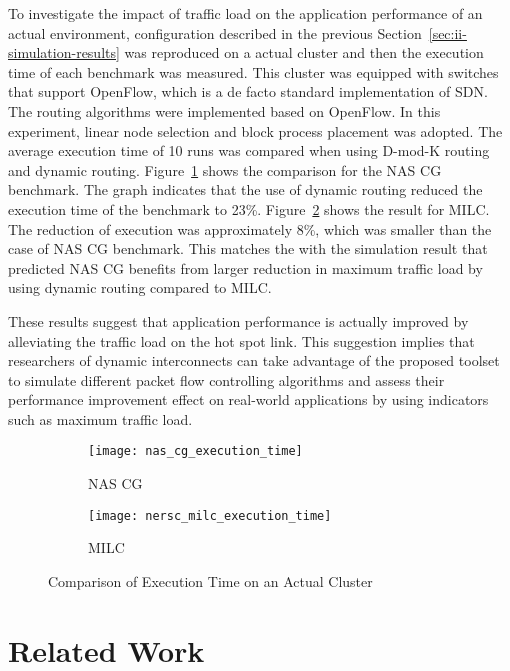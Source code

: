 To investigate the impact of traffic load on the application performance of an
actual environment, configuration described in the previous
Section~\ref{sec:ii-simulation-results} was reproduced on a actual cluster and
then the execution time of each benchmark was measured. This cluster was
equipped with switches that support OpenFlow, which is a de facto standard
implementation of SDN\@. The routing algorithms were implemented based on
OpenFlow. In this experiment, linear node selection and block process
placement was adopted. The average execution time of 10 runs was compared when
using \mbox{D-mod-K} routing and dynamic routing. Figure~\ref{fig:nas-cg-time}
shows the comparison for the NAS CG benchmark. The graph indicates that the
use of dynamic routing reduced the execution time of the benchmark to 23\%.
Figure~\ref{fig:nersc-milc-time} shows the result for MILC\@. The reduction of
execution was approximately 8\%, which was smaller than the case of NAS CG
benchmark. This matches the with the simulation result that predicted NAS CG
benefits from larger reduction in maximum traffic load by using dynamic
routing compared to MILC\@.

These results suggest that application performance is actually improved
by alleviating the traffic load on the hot spot link. This suggestion
implies that researchers of dynamic interconnects can take advantage of
the proposed toolset to simulate different packet flow controlling algorithms
and assess their performance improvement effect on real-world applications by
using indicators such as maximum traffic load.

\begin{figure}
    \begin{subfigure}{.47\linewidth}
        \centering
        \texttt{[image: nas\_cg\_execution\_time]}
        \caption{NAS CG}%
        \label{fig:nas-cg-time}
    \end{subfigure}%
    \begin{subfigure}{.47\linewidth}
        \centering
        \texttt{[image: nersc\_milc\_execution\_time]}
        \caption{MILC}%
        \label{fig:nersc-milc-time}
    \end{subfigure}
    \caption{Comparison of Execution Time on an Actual Cluster}%
    \label{fig:single-job-time}
\end{figure}

\section{Related Work}\label{sec:ii-related-work}

